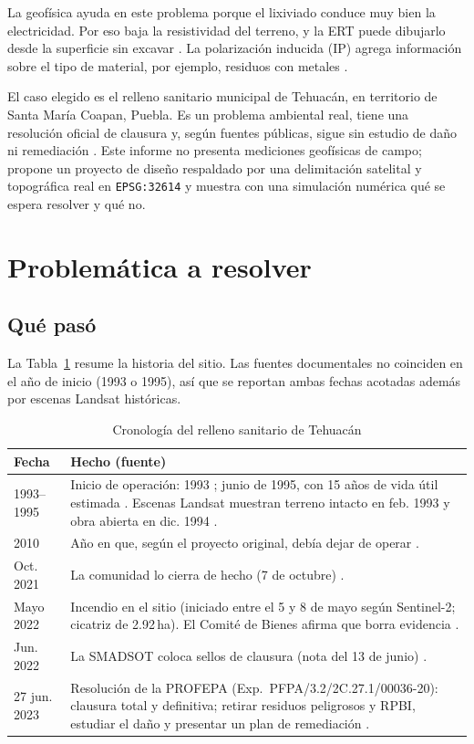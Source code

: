 La geofísica ayuda en este problema porque el lixiviado conduce muy bien la electricidad. Por eso baja la resistividad del terreno, y la ERT puede dibujarlo desde la superficie sin excavar \cite{maurya2017,helene2020}. La polarización inducida (IP) agrega información sobre el tipo de material, por ejemplo, residuos con metales \cite{abdulrahman2016}.

El caso elegido es el relleno sanitario municipal de Tehuacán, en territorio de Santa María Coapan, Puebla. Es un problema ambiental real, tiene una resolución oficial de clausura y, según fuentes públicas, sigue sin estudio de daño ni remediación \cite{greenpeace,profepa}. Este informe no presenta mediciones geofísicas de campo; propone un proyecto de diseño respaldado por una delimitación satelital y topográfica real en \texttt{EPSG:32614} y muestra con una simulación numérica qué se espera resolver y qué no.

\section{Problemática a resolver}
\subsection{Qué pasó}
La Tabla~\ref{tab:cron} resume la historia del sitio. Las fuentes documentales no coinciden en el año de inicio (1993 o 1995), así que se reportan ambas fechas acotadas además por escenas Landsat históricas.

\begin{table}[!t]
\caption{Cronología del relleno sanitario de Tehuacán}
\label{tab:cron}
\centering
\small
\begin{tabular}{@{}p{}p{}@{}}
\toprule
Fecha & Hecho (fuente)\\
\midrule
1993--1995 & Inicio de operación: 1993 \cite{greenpeace}; junio de 1995, con 15 años de vida útil estimada \cite{linares}. Escenas Landsat muestran terreno intacto en feb. 1993 y obra abierta en dic. 1994 \cite{usgs}.\\
2010 & Año en que, según el proyecto original, debía dejar de operar \cite{linares}.\\
Oct. 2021 & La comunidad lo cierra de hecho (7 de octubre) \cite{greenpeace}.\\
Mayo 2022 & Incendio en el sitio (iniciado entre el 5 y 8 de mayo según Sentinel-2; cicatriz de 2.92\,ha). El Comité de Bienes afirma que borra evidencia \cite{ciudadano,esa}.\\
Jun. 2022 & La SMADSOT coloca sellos de clausura (nota del 13 de junio) \cite{publimetro}.\\
27 jun. 2023 & Resolución de la PROFEPA (Exp.\ PFPA/3.2/2C.27.1/00036-20): clausura total y definitiva; retirar residuos peligrosos y RPBI, estudiar el daño y presentar un plan de remediación \cite{greenpeace,profepa}.\\
\bottomrule
\end{tabular}
\end{table}

